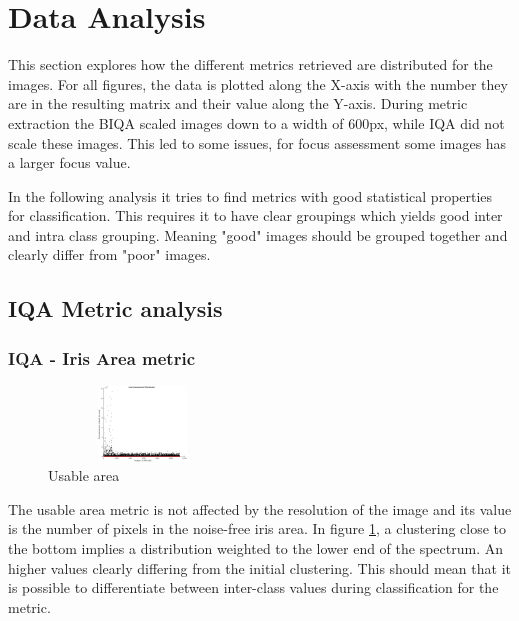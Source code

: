 \section{Data Analysis}\label{sec:analysis}
\vspace{-3mm}
This section explores how the different metrics retrieved are distributed for
the images.  For all figures, the data is plotted along the X-axis with the
number they are in the resulting matrix and their value along the Y-axis.
During metric extraction the BIQA scaled images down to a width of 600px, while
IQA did not scale these images.  This led to some issues, for focus assessment
some images has a larger focus value.

In the following analysis it tries to find metrics with good statistical
properties for classification. This requires it to have clear groupings which
yields good inter and intra class grouping. Meaning "good" images should be
grouped together and clearly differ from "poor" images.

\subsection{IQA Metric analysis}
\vspace{-3mm}
\subsubsection{IQA - Iris Area metric}\vspace{-5mm}
	\begin{figure}
		\centering
		\includegraphics[height=2cm, width=5cm]{pics/dist_area_assess}
		\caption{Usable area\cite{hugo}}
		\label{fig:area}
	\end{figure}
The usable area metric is not affected by the resolution of the image and its
value is the number of pixels in the noise-free iris area.
In figure \ref{fig:area}, a clustering close to the bottom implies a
distribution weighted to the lower end of the spectrum. An higher values clearly
differing from the initial clustering.  This should mean that it is possible to
differentiate between inter-class values during classification for the metric.

